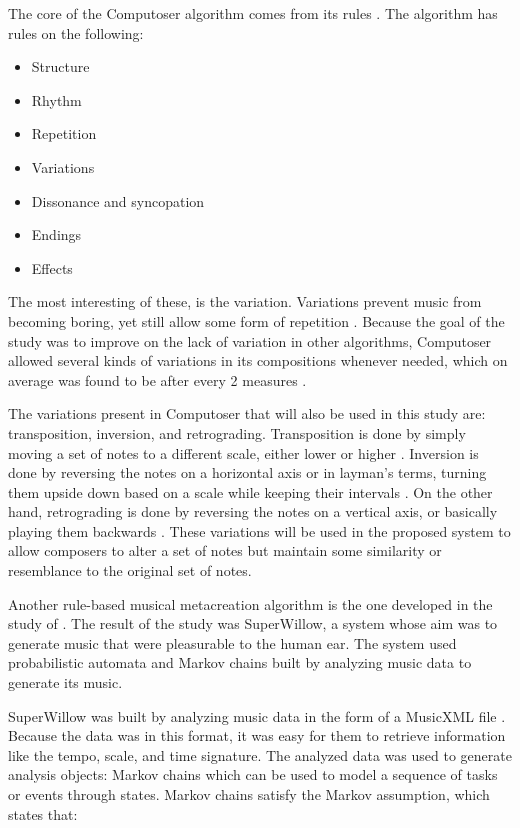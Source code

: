 The core of the Computoser algorithm comes from its rules \citep{bozhanov2014computoser}. The algorithm has rules on the following:

\begin{itemize}
\item Structure
\item Rhythm
\item Repetition
\item Variations
\item Dissonance and syncopation
\item Endings
\item Effects
\end{itemize}

The most interesting of these, is the variation. Variations prevent music from becoming boring, yet still allow some form of repetition \citep{kivy1993fine,bozhanov2014computoser}. Because the goal of the study was to improve on the lack of variation in other algorithms, Computoser allowed several kinds of variations in its compositions whenever needed, which on average was found to be after every 2 measures \citep{bozhanov2014computoser}. 

The variations present in Computoser that will also be used in this study are: transposition, inversion, and retrograding. Transposition is done by simply moving a set of notes to a different scale, either lower or higher \citep{owens1998composers}. Inversion is done by reversing the notes on a horizontal axis or in layman's terms, turning them upside down based on a scale while keeping their intervals \citep{owens1998composers}. On the other hand, retrograding is done by reversing the notes on a vertical axis, or basically playing them backwards \citep{owens1998composers}. These variations will be used in the proposed system to allow composers to alter a set of notes but maintain some similarity or resemblance to the original set of notes.

Another rule-based musical metacreation algorithm is the one developed in the study of \citep{schulze2011music}. The result of the study was SuperWillow, a system whose aim was to generate music that were pleasurable to the human ear. The system used probabilistic automata and Markov chains built by analyzing music data to generate its music. 

SuperWillow was built by analyzing music data in the form of a MusicXML file \citep{schulze2011music}. Because the data was in this format, it was easy for them to retrieve information like the tempo, scale, and time signature. The analyzed data was used to generate analysis objects: Markov chains which can be used to model a sequence of tasks or events through states. Markov chains satisfy the Markov assumption, which states that: 

